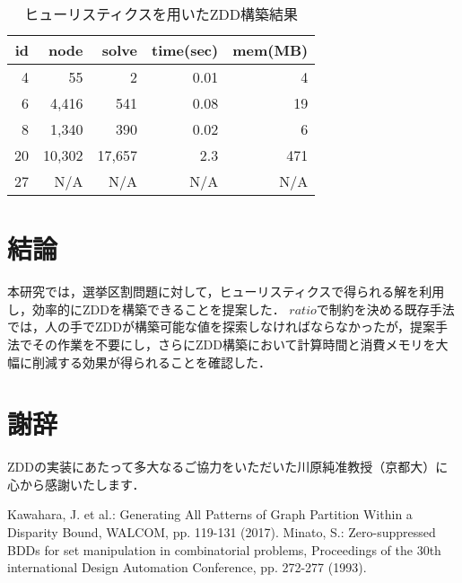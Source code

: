 \documentclass[twoside,twocolumn,11pt]{jarticle}  %
\begin{document}
\begin{table}
  \small
  \caption{ヒューリスティクスを用いたZDD構築結果}
  \label{table:answer_h}
  \centering
  \begin{tabular}{r|rrrr}
    \hline
    id & node & solve & time(sec) & mem(MB) \\
    \hline\hline
    4 & 55 & 2 & 0.01 & 4 \\
    6 & 4{,}416 & 541 & 0.08 & 19 \\
    8 & 1{,}340 & 390 & 0.02 & 6 \\
    20 & 10{,}302 & 17{,}657 & 2.3 & 471 \\
    27 & N/A & N/A & N/A & N/A \\
  \end{tabular}
\end{table}

\section{結論}
本研究では，選挙区割問題に対して，ヒューリスティクスで得られる解を利用し，効率的にZDDを構築できることを提案した．
$ratio$で制約を決める既存手法では，人の手でZDDが構築可能な値を探索しなければならなかったが，提案手法でその作業を不要にし，さらにZDD構築において計算時間と消費メモリを大幅に削減する効果が得られることを確認した．
\section*{謝辞}
ZDDの実装にあたって多大なるご協力をいただいた川原純准教授（京都大）に心から感謝いたします．
\begin{thebibliography}{9}
  Kawahara, J. et al.: Generating All Patterns of Graph Partition Within a Disparity Bound, WALCOM, pp. 119-131 (2017).
  Minato, S.: Zero-suppressed BDDs for set manipulation in combinatorial problems,
  Proceedings of the 30th international Design Automation Conference,
  pp. 272-277 (1993).
\end{thebibliography}
\end{document}
